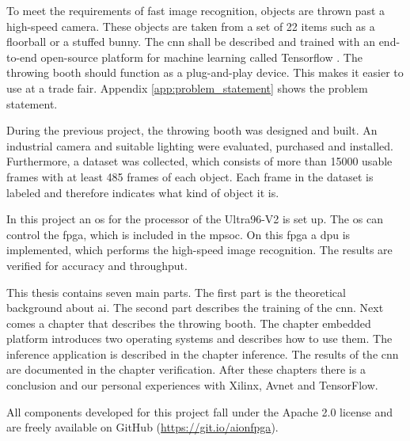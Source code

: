 To meet the requirements of fast image recognition, objects are thrown past a high-speed camera.
These objects are taken from a set of 22 items such as a floorball or a stuffed bunny.
The \acrshort{cnn} shall be described and trained with an end-to-end open-source platform for machine learning called Tensorflow \cite{tensorflow_main}.
The throwing booth should function as a plug-and-play device.
This makes it easier to use at a trade fair.
Appendix \ref{app:problem_statement} shows the problem statement.

During the previous project, the throwing booth was designed and built.
An industrial camera and suitable lighting were evaluated, purchased and installed.
Furthermore, a dataset was collected, which consists of more than \num{15000} usable frames with at least \num{485} frames of each object.
Each frame in the dataset is labeled and therefore indicates what kind of object it is.

In this project an \acrfull{os} for the processor of the Ultra96-V2 is set up.
The \acrshort{os} can control the \acrfull{fpga}, which is included in the \acrfull{mpsoc}.
On this \acrshort{fpga} a \acrfull{dpu} is implemented, which performs the high-speed image recognition.
The results are verified for accuracy and throughput.

This thesis contains seven main parts.
The first part is the theoretical background about \acrfull{ai}.
The second part describes the training of the \acrlong{cnn}.
Next comes a chapter that describes the throwing booth.
The chapter embedded platform introduces two operating systems and describes how to use them.
The inference application is described in the chapter inference.
The results of the \acrshort{cnn} are documented in the chapter verification.
After these chapters there is a conclusion and our personal experiences with Xilinx, Avnet and TensorFlow.

All components developed for this project fall under the Apache 2.0 license and are freely available on GitHub (\url{https://git.io/aionfpga}).
